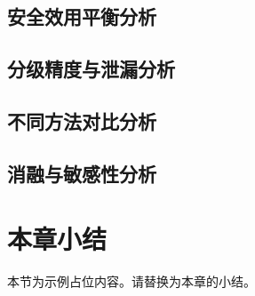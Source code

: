 \subsection{安全效用平衡分析}

\subsection{分级精度与泄漏分析}

\subsection{不同方法对比分析}

\subsection{消融与敏感性分析}

\section{本章小结}
本节为示例占位内容。请替换为本章的小结。
